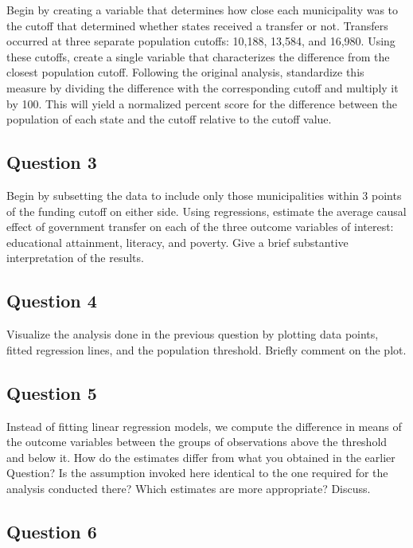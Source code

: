 \documentclass[]{article}
\begin{document}
Begin by creating a variable that determines how close each municipality
was to the cutoff that determined whether states received a transfer or
not. Transfers occurred at three separate population cutoffs: 10,188,
13,584, and 16,980. Using these cutoffs, create a single variable that
characterizes the difference from the closest population cutoff.
Following the original analysis, standardize this measure by dividing
the difference with the corresponding cutoff and multiply it by 100.
This will yield a normalized percent score for the difference between
the population of each state and the cutoff relative to the cutoff
value.

\subsection{Question 3}\label{question-3}

Begin by subsetting the data to include only those municipalities within
3 points of the funding cutoff on either side. Using regressions,
estimate the average causal effect of government transfer on each of the
three outcome variables of interest: educational attainment, literacy,
and poverty. Give a brief substantive interpretation of the results.

\subsection{Question 4}\label{question-4}

Visualize the analysis done in the previous question by plotting data
points, fitted regression lines, and the population threshold. Briefly
comment on the plot.

\subsection{Question 5}\label{question-5}

Instead of fitting linear regression models, we compute the difference
in means of the outcome variables between the groups of observations
above the threshold and below it. How do the estimates differ from what
you obtained in the earlier Question? Is the assumption invoked here
identical to the one required for the analysis conducted there? Which
estimates are more appropriate? Discuss.

\subsection{Question 6}\label{question-6}
\end{document}
